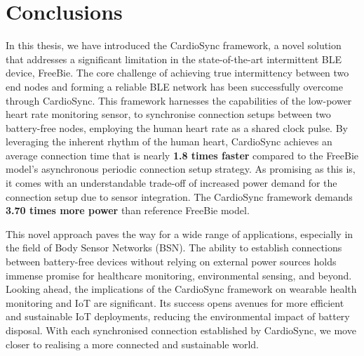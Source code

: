\chapter{Conclusions}
\label{chp:conclusions}

In this thesis, we have introduced the CardioSync framework, a novel solution that addresses a significant limitation in the state-of-the-art intermittent BLE device, FreeBie. The core challenge of achieving true intermittency between two end nodes and forming a reliable BLE network has been successfully overcome through CardioSync. This framework harnesses the capabilities of the low-power heart rate monitoring sensor, to synchronise connection setups between two battery-free nodes, employing the human heart rate as a shared clock pulse. By leveraging the inherent rhythm of the human heart, CardioSync achieves an average connection time that is nearly \textbf{1.8 times faster} compared to the FreeBie model's asynchronous periodic connection setup strategy. As promising as this is, it comes with an understandable trade-off of increased power demand for the connection setup due to sensor integration. The CardioSync framework demands \textbf{3.70 times more power} than reference FreeBie model.
\vspace{1\baselineskip}

\noindent This novel approach paves the way for a wide range of applications, especially in the field of Body Sensor Networks (BSN). The ability to establish connections between battery-free devices without relying on external power sources holds immense promise for healthcare monitoring, environmental sensing, and beyond. Looking ahead, the implications of the CardioSync framework on wearable health monitoring and IoT are significant. Its success opens avenues for more efficient and sustainable IoT deployments, reducing the environmental impact of battery disposal. With each synchronised connection established by CardioSync, we move closer to realising a more connected and sustainable world.